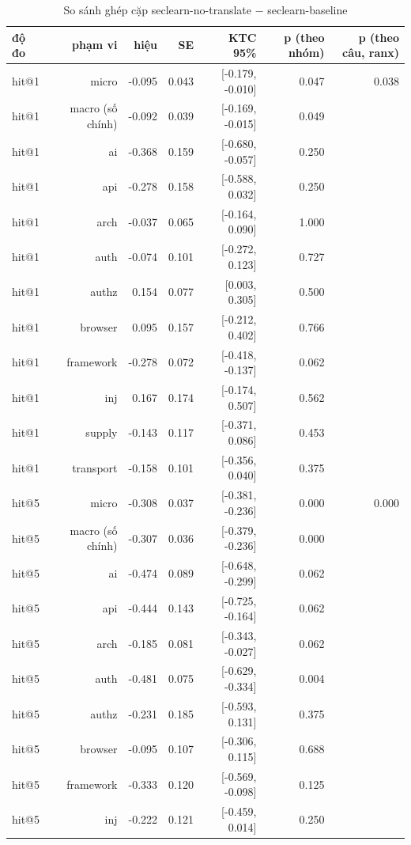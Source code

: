 \begin{table}[ht]
\centering
\caption{So sánh ghép cặp seclearn-no-translate $-$ seclearn-baseline}
\begin{tabular}{lrrrrrr}
\toprule
độ đo & phạm vi & hiệu & SE & KTC 95\% & p (theo nhóm) & p (theo câu, ranx) \\
\midrule
hit@1 & micro & -0.095 & 0.043 & [-0.179, -0.010] & 0.047 & 0.038 \\
hit@1 & macro (số chính) & -0.092 & 0.039 & [-0.169, -0.015] & 0.049 &  \\
hit@1 & ai & -0.368 & 0.159 & [-0.680, -0.057] & 0.250 &  \\
hit@1 & api & -0.278 & 0.158 & [-0.588, 0.032] & 0.250 &  \\
hit@1 & arch & -0.037 & 0.065 & [-0.164, 0.090] & 1.000 &  \\
hit@1 & auth & -0.074 & 0.101 & [-0.272, 0.123] & 0.727 &  \\
hit@1 & authz & 0.154 & 0.077 & [0.003, 0.305] & 0.500 &  \\
hit@1 & browser & 0.095 & 0.157 & [-0.212, 0.402] & 0.766 &  \\
hit@1 & framework & -0.278 & 0.072 & [-0.418, -0.137] & 0.062 &  \\
hit@1 & inj & 0.167 & 0.174 & [-0.174, 0.507] & 0.562 &  \\
hit@1 & supply & -0.143 & 0.117 & [-0.371, 0.086] & 0.453 &  \\
hit@1 & transport & -0.158 & 0.101 & [-0.356, 0.040] & 0.375 &  \\
hit@5 & micro & -0.308 & 0.037 & [-0.381, -0.236] & 0.000 & 0.000 \\
hit@5 & macro (số chính) & -0.307 & 0.036 & [-0.379, -0.236] & 0.000 &  \\
hit@5 & ai & -0.474 & 0.089 & [-0.648, -0.299] & 0.062 &  \\
hit@5 & api & -0.444 & 0.143 & [-0.725, -0.164] & 0.062 &  \\
hit@5 & arch & -0.185 & 0.081 & [-0.343, -0.027] & 0.062 &  \\
hit@5 & auth & -0.481 & 0.075 & [-0.629, -0.334] & 0.004 &  \\
hit@5 & authz & -0.231 & 0.185 & [-0.593, 0.131] & 0.375 &  \\
hit@5 & browser & -0.095 & 0.107 & [-0.306, 0.115] & 0.688 &  \\
hit@5 & framework & -0.333 & 0.120 & [-0.569, -0.098] & 0.125 &  \\
hit@5 & inj & -0.222 & 0.121 & [-0.459, 0.014] & 0.250 &  \\

\end{tabular}
\end{table}
